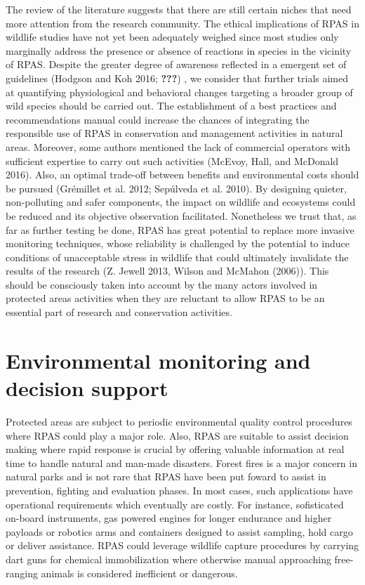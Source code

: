 \documentclass[]{interact}
\theoremstyle{plain}%
\theoremstyle{definition}
\theoremstyle{remark}
\begin{document}
The review of the literature suggests that there are still certain
niches that need more attention from the research community. The ethical
implications of RPAS in wildlife studies have not yet been adequately
weighed since most studies only marginally address the presence or
absence of reactions in species in the vicinity of RPAS. Despite the
greater degree of awareness reflected in a emergent set of guidelines
(Hodgson and Koh 2016; {\textbf{???}}) , we consider that further trials
aimed at quantifying physiological and behavioral changes targeting a
broader group of wild species should be carried out. The establishment
of a best practices and recommendations manual could increase the
chances of integrating the responsible use of RPAS in conservation and
management activities in natural areas. Moreover, some authors mentioned
the lack of commercial operators with sufficient expertise to carry out
such activities (McEvoy, Hall, and McDonald 2016). Also, an optimal
trade-off between benefits and environmental costs should be pursued
(Grémillet et al. 2012; Sepúlveda et al. 2010). By designing quieter,
non-polluting and safer components, the impact on wildlife and
ecosystems could be reduced and its objective observation facilitated.
Nonetheless we trust that, as far as further testing be done, RPAS has
great potential to replace more invasive monitoring techniques, whose
reliability is challenged by the potential to induce conditions of
unacceptable stress in wildlife that could ultimately invalidate the
results of the research (Z. Jewell 2013, Wilson and McMahon (2006)).
This should be consciously taken into account by the many actors
involved in protected areas activities when they are reluctant to allow
RPAS to be an essential part of research and conservation activities.

\section{Environmental monitoring and decision
support}\label{environmental-monitoring-and-decision-support}

Protected areas are subject to periodic environmental quality control
procedures where RPAS could play a major role. Also, RPAS are suitable
to assist decision making where rapid response is crucial by offering
valuable information at real time to handle natural and man-made
disasters. Forest fires is a major concern in natural parks and is not
rare that RPAS have been put foward to assist in prevention, fighting
and evaluation phases. In most cases, such applications have operational
requirements which eventually are costly. For instance, sofisticated
on-board instruments, gas powered engines for longer endurance and
higher payloads or robotics arms and containers designed to assist
sampling, hold cargo or deliver assistance. RPAS could leverage wildlife
capture procedures by carrying dart guns for chemical immobilization
where otherwise manual approaching free-ranging animals is considered
inefficient or dangerous.
\end{document}
